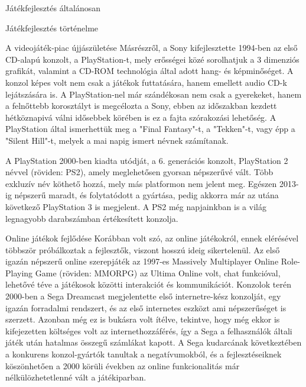 \begin{MyChapter}{Játékfejlesztés általánosan}
\begin{MySection}{Játékfejlesztés történelme}
\begin{MySubSection}{A videojáték-piac újjászületése}
			Másrészről, a Sony kifejlesztette 1994-ben az első CD-alapú konzolt, a PlayStation-t, mely erősségei közé sorolhatjuk a 3 dimenziós grafikát, valamint a CD-ROM technológia által adott hang- és képminőséget. A konzol képes volt nem csak a játékok futtatására, hanem emellett audio CD-k lejátszására is. A PlayStation-nel már szándékosan nem csak a gyerekeket, hanem a felnőttebb korosztályt is megcélozta a Sony, ebben az időszakban kezdett hétköznapivá válni idősebbek körében is ez a fajta szórakozási lehetőség. A PlayStation által ismerhettük meg a "Final Fantasy"-t, a "Tekken"-t, vagy épp a "Silent Hill"-t, melyek a mai napig ismert névnek számítanak.
			
			A PlayStation 2000-ben kiadta utódját, a 6. generációs konzolt, PlayStation 2 névvel (röviden: PS2), amely meglehetősen gyorsan népszerűvé vált. Több exkluzív név köthető hozzá, mely más platformon nem jelent meg. Egészen 2013-ig népszerű maradt, és folytatódott a gyártása, pedig akkorra már az utána következő PlayStation 3 is megjelent. A PS2 még napjainkban is a világ legnagyobb darabszámban értékesített konzolja.
			\cite{videjatek_konzol}
			\cite{playstation}
		\end{MySubSection}
		
		\begin{MySubSection}{Online játékok fejlődése}
			Korábban volt szó, az online játékokról, ennek elérésével többször próbálkoztak a fejlesztők, viszont hosszú ideig sikertelenül. Az első igazán népszerű online szerepjáték az 1997-es Massively Multiplayer Online Role-Playing Game (röviden: MMORPG) az Ultima Online volt, chat funkcióval, lehetővé téve a játékosok közötti interakciót és kommunikációt. Konzolok terén 2000-ben a Sega Dreamcast megjelentette első internetre-kész konzolját, egy igazán forradalmi rendszert, és az első internetes eszközt ami népszerűséget is szerzett. Azonban még ez is bukásra volt ítélve, tekintve, hogy még ekkor is kifejezetten költséges volt az internethozzáférés, így a Sega a felhasználók általi játék után hatalmas összegű számlákat kapott. A Sega kudarcának következtében a konkurens konzol-gyártók tanultak a negatívumokból, és a fejlesztéseiknek köszönhetően a 2000 körüli években az online funkcionalitás már nélkülözhetetlenné vált a játékiparban.
			\cite{mmorpg}
		\end{MySubSection}
		

\end{MySection}
\end{MyChapter}
